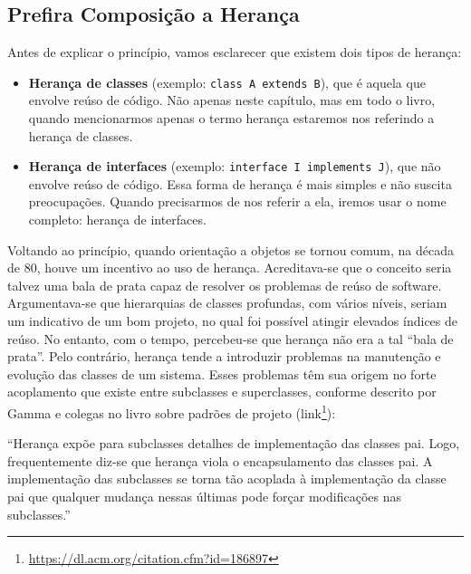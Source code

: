 \documentclass[
  11pt,
  twoside]{book}
\newcommand{\passthrough}[1]{#1}
\DeclareRobustCommand{\href}[2]{#2\footnote{\url{#1}}}
\renewenvironment{quote}{\centering \vspace{1.5ex} \begin{tcolorbox}[colback=backcolor, width=4.9in]}{\end{tcolorbox}}
\begin{document}
\hypertarget{prefira-composiuxe7uxe3o-a-heranuxe7a}{%
\subsection{Prefira Composição a
Herança}\label{prefira-composiuxe7uxe3o-a-heranuxe7a}}


Antes de explicar o princípio, vamos esclarecer que existem dois tipos
de herança:

\begin{itemize}
\item
  \textbf{Herança de classes}  (exemplo:
  \passthrough{\lstinline!class A extends B!}), que é aquela que envolve
  reúso de código. Não apenas neste capítulo, mas em todo o livro,
  quando mencionarmos apenas o termo herança estaremos nos referindo a
  herança de classes.
\item
  \textbf{Herança de interfaces}  (exemplo:
  \passthrough{\lstinline!interface I implements J!}), que não envolve
  reúso de código. Essa forma de herança é mais simples e não suscita
  preocupações. Quando precisarmos de nos referir a ela, iremos usar o
  nome completo: herança de interfaces.
\end{itemize}

Voltando ao princípio, quando orientação a objetos se tornou comum, na
década de 80, houve um incentivo ao uso de herança. Acreditava-se que o
conceito seria talvez uma bala de prata capaz de resolver os problemas
de reúso de software. Argumentava-se que hierarquias de classes
profundas, com vários níveis, seriam um indicativo de um bom projeto, no
qual foi possível atingir elevados índices de reúso. No entanto, com o
tempo, percebeu-se que herança não era a tal ``bala de prata''. Pelo
contrário, herança tende a introduzir problemas na manutenção e evolução
das classes de um sistema. Esses problemas têm sua origem no forte
acoplamento que existe entre subclasses e superclasses, conforme
descrito por Gamma e colegas no livro sobre padrões de projeto
(\href{https://dl.acm.org/citation.cfm?id=186897}{link}):


\begin{quote}
``Herança expõe para subclasses detalhes de implementação das classes
pai. Logo, frequentemente diz-se que herança viola o encapsulamento das
classes pai. A implementação das subclasses se torna tão acoplada à
implementação da classe pai que qualquer mudança nessas últimas pode
forçar modificações nas subclasses.''
\end{quote}
\end{document}
